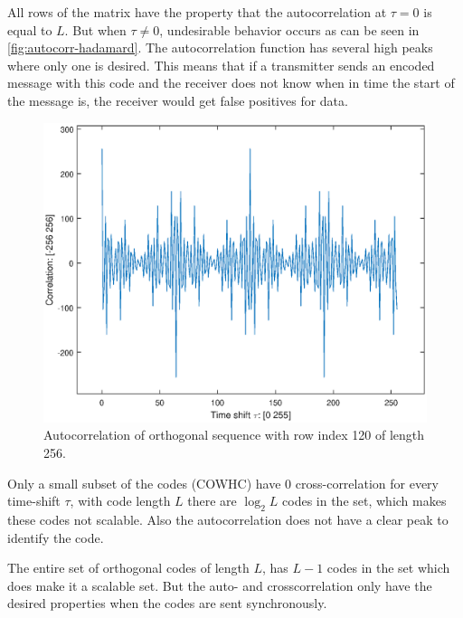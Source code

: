 All rows of the matrix have the property that the autocorrelation at $\tau = 0$ is equal to $L$.
But when $\tau \neq 0$, undesirable behavior occurs as can be seen in \autoref{fig:autocorr-hadamard}.
The autocorrelation function has several high peaks where only one is desired.
This means that if a transmitter sends an encoded message with this code and the receiver does not know when in time the start of the message is, the receiver would get false positives for data.

\begin{figure}
	\centering
	\includegraphics[width=\textwidth]{chapters/cdma-chapters/autocorr-hadamard.eps}
	\caption{Autocorrelation of orthogonal sequence with row index 120 of length 256.}
	\label{fig:autocorr-hadamard}
\end{figure}


Only a small subset of the codes (COWHC) have $0$ cross-correlation for every time-shift $\tau$, with code length $L$ there are $\log_2 L$ codes in the set, which makes these codes not scalable. Also the autocorrelation does not have a clear peak to identify the code.

The entire set of orthogonal codes of length $L$, has $L - 1$ codes in the set which does make it a scalable set.
But the auto- and crosscorrelation only have the desired properties when the codes are sent synchronously. 
